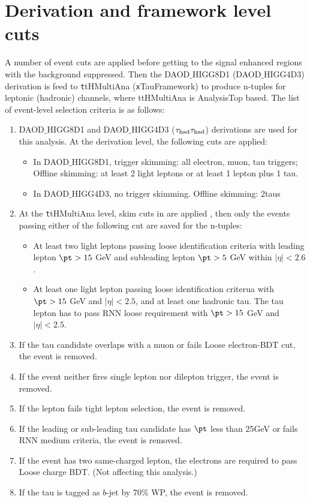\section{Derivation and framework level cuts}
\label{app:cuts}
A number of event cuts are applied before getting to the signal enhanced regions with the background suppressed. Then the DAOD$\_$HIGG8D1 (DAOD$\_$HIGG4D3) derivation is feed to {\texttt ttHMultiAna} ({\texttt xTauFramework}) to produce n-tuples for leptonic (hadronic) channels, where ttHMultiAna is AnalysisTop \cite{AnalysisTop} based. The list of event-level selection criteria is as follows:

\begin{enumerate}
\item DAOD$\_$HIGG8D1 and DAOD$\_$HIGG4D3 ($\tau_\text{had}{}\tau_\text{had}$) derivations are used for this analysis. At the derivation level, the following cuts are applied:
  \begin{itemize}
  \item In DAOD$\_$HIGG8D1, trigger skimming: all electron, muon, tau triggers; Offline skimming: at least 2 light leptons or at least 1 lepton plus 1 tau.
  \item In DAOD$\_$HIGG4D3, no trigger skimming. Offline skimming: 2taus
  \end{itemize}
\item At the {\texttt ttHMultiAna} level, skim cuts in \cite{ATL-COM-PHYS-2018-410} are applied , then only the events passing either of the following cut are saved for the n-tuples:
  \begin{itemize}
  \item At least two light leptons passing loose identification criteria with leading lepton $\pt > 15$ GeV and subleading lepton $\pt > 5$ GeV within $|\eta|<2.6$.
  \item At least one light lepton passing loose identification criterua with $\pt >15$ GeV and $|\eta|<2.5$, and at least one hadronic tau. The tau lepton has to pass RNN loose requirement with $\pt >15$ GeV and $|\eta|<2.5$.
  \end{itemize}
\item If the tau candidate overlaps with a muon or fails Loose electron-BDT cut, the event is removed.
\item If the event neither fires single lepton nor dilepton trigger, the event is removed.
\item If the lepton fails tight lepton selection, the event is removed.
\item If the leading or sub-leading tau candidate has $\pt$ less than 25GeV or fails RNN medium criteria, the event is removed.
\item If the event has two same-charged lepton, the electrons are required to pass Loose charge BDT. (Not affecting this analysis.)
\item If the tau is tagged as $b$-jet by 70\% WP, the event is removed.




\end{enumerate}
